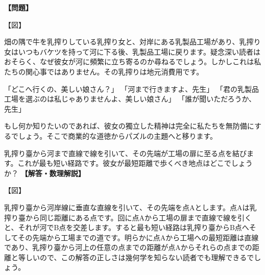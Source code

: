 \documentclass[10pt,a4paper,oneside,openany]{ltjsbook}
\begin{document}
\begin{tcolorbox}[colback=softblue,colframe=primaryblue,title=\textbf{第 187 問：乳搾り女のパズル （原題: THE MILKMAID PUZZLE.）},arc=2mm,boxrule=1pt,breakable]
\textbf{【問題】}\par\vspace{0.3em}
【図】

畑の隅で牛を乳搾りしている乳搾り女と、対岸にある乳製品工場があり、乳搾り女はいつもバケツを持って河に下る後、乳製品工場に戻ります。疑念深い読者はおそらく、なぜ彼女が河に頻繁に立ち寄るのか尋ねるでしょう。しかしこれは私たちの関心事ではありません。その乳搾りは地元消費用です。

「どこへ行くの、美しい娘さん？」
「河まで行きますよ、先生」
「君の乳製品工場を選ぶのは私じゃありませんよ、美しい娘さん」
「誰が聞いただろうか、先生」

もし何か知りたいのであれば、彼女の獨立した精神は完全に私たちを無防備にするでしょう。そこで商業的な道徳からパズルの主題へと移ります。

乳搾り臺から河まで直線で線を引いて、その先端が工場の扉に至る点を結びます。これが最も短い経路です。彼女が最短距離で歩くべき地点はどこでしょうか？
\tcblower
\textbf{【解答・数理解説】}\par\vspace{0.3em}
【図】

乳搾り臺から河岸線に垂直な直線を引いて、その先端を点Aとします。点Aは乳搾り臺から同じ距離にある点です。回に点Aから工場の扉まで直線で線を引くと、それが河でB点を交差します。すると最も短い経路は乳搾り臺からB点へそしてその先端から工場までの道です。明らかに点Aから工場への最短距離は直線であり、乳搾り臺から河上の任意の点までの距離が点Aからそれらの点までの距離と等しいので、この解答の正しさは幾何学を知らない読者でも理解できるでしょう。
\end{tcolorbox}
\end{document}
